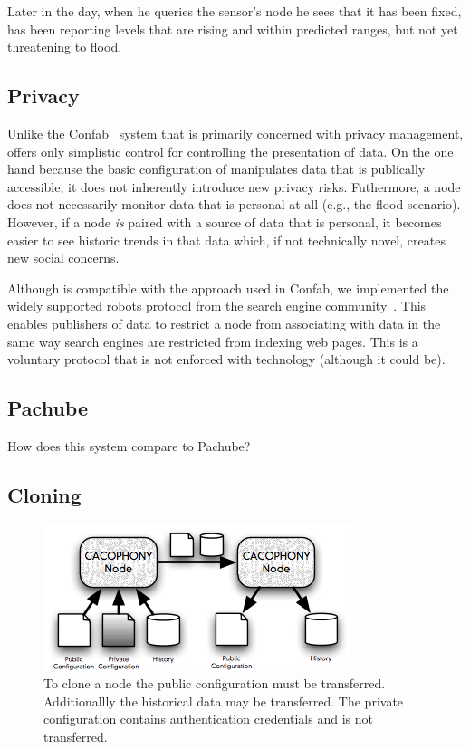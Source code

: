 Later in the day, when he queries the sensor's \Cacophony node he sees that it
has been fixed, has been reporting levels that are rising and within predicted
ranges, but not yet threatening to flood.


\subsection{Privacy}

Unlike the Confab~\cite{Hong2004} system that is primarily concerned with
privacy management, \Cacophony offers only simplistic control for controlling
the presentation of data.  On the one hand because the basic configuration of \Cacophony
manipulates data that is publically accessible, it does not inherently introduce
new privacy risks.  Futhermore, a \Cacophony node does not necessarily monitor
data that is personal at all (e.g., the flood scenario).   However, if a
\Cacophony node \emph{is} paired with a source of data that is
personal, it becomes easier to see historic trends in that data which, if not
technically novel, creates new social concerns.  

Although \Cacophony is compatible with
the approach used in Confab, we implemented the widely supported robots protocol from the search
engine community~\cite{robotstxt}.  This enables publishers of data to restrict
a \Cacophony node from associating with data in the same way search engines
are restricted from indexing web pages.  This is a voluntary protocol that is
not enforced with technology (although it could be).

\subsection{Pachube}
How does this system compare to Pachube?

\subsection{Cloning}

\begin{figure}
	\begin{center}
		\includegraphics[width=1.00\columnwidth]{images/cloning}

	\caption{\label{fig:cloning}To clone a \Cacophony node the public
	configuration must be transferred.  Additionallly the historical data may be
	transferred.  The private configuration contains authentication credentials
	and is not transferred.}
	\end{center}
\end{figure}


